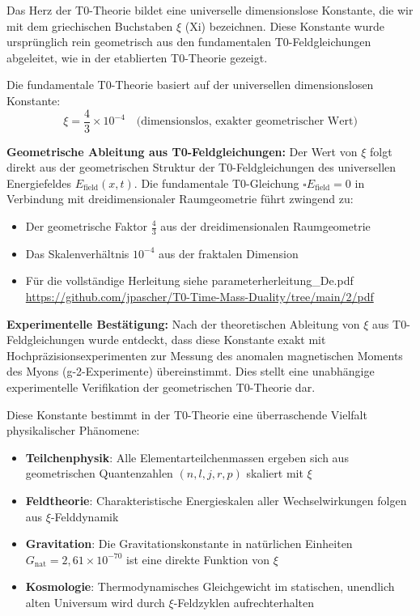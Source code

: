 \documentclass[12pt,a4paper]{article}
\theoremstyle{definition}
\theoremstyle{remark}
\begin{document}
	Das Herz der T0-Theorie bildet eine universelle dimensionslose Konstante, die wir mit dem griechischen Buchstaben $\xi$ (Xi) bezeichnen. Diese Konstante wurde urspr\"unglich rein geometrisch aus den fundamentalen T0-Feldgleichungen abgeleitet, wie in der etablierten T0-Theorie \cite{T0Theory} gezeigt.
	
	Die fundamentale T0-Theorie basiert auf der universellen dimensionslosen Konstante:
	\begin{equation}
		\xi = \frac{4}{3} \times 10^{-4} \quad \text{(dimensionslos, exakter geometrischer Wert)}
	\end{equation}
	
	\textbf{Geometrische Ableitung aus T0-Feldgleichungen:} Der Wert von $\xi$ folgt direkt aus der geometrischen Struktur der T0-Feldgleichungen des universellen Energiefeldes $E_{\text{field}}(x,t)$. Die fundamentale T0-Gleichung $\square E_{\text{field}} = 0$ in Verbindung mit dreidimensionaler Raumgeometrie f\"uhrt zwingend zu:
\begin{itemize}
	\item Der geometrische Faktor $\frac{4}{3}$ aus der dreidimensionalen Raumgeometrie
	\item Das Skalenverhältnis $10^{-4}$ aus der fraktalen Dimension
	\item Für die vollständige Herleitung siehe parameterherleitung\_De.pdf \url{https://github.com/jpascher/T0-Time-Mass-Duality/tree/main/2/pdf}
\end{itemize}
	
	\textbf{Experimentelle Best\"atigung:} Nach der theoretischen Ableitung von $\xi$ aus T0-Feldgleichungen wurde entdeckt, dass diese Konstante exakt mit Hochpr\"azisionsexperimenten zur Messung des anomalen magnetischen Moments des Myons (g-2-Experimente) \"ubereinstimmt. Dies stellt eine unabh\"angige experimentelle Verifikation der geometrischen T0-Theorie dar.
	
	Diese Konstante bestimmt in der T0-Theorie eine \"uberraschende Vielfalt physikalischer Ph\"anomene:
	\begin{itemize}
		\item \textbf{Teilchenphysik}: Alle Elementarteilchenmassen ergeben sich aus geometrischen Quantenzahlen $(n,l,j,r,p)$ skaliert mit $\xi$
		\item \textbf{Feldtheorie}: Charakteristische Energieskalen aller Wechselwirkungen folgen aus $\xi$-Felddynamik
		\item \textbf{Gravitation}: Die Gravitationskonstante in nat\"urlichen Einheiten $G_{\text{nat}} = 2{,}61 \times 10^{-70}$ ist eine direkte Funktion von $\xi$
		\item \textbf{Kosmologie}: Thermodynamisches Gleichgewicht im statischen, unendlich alten Universum wird durch $\xi$-Feldzyklen aufrechterhalten
	\end{itemize}
	
\end{document}
